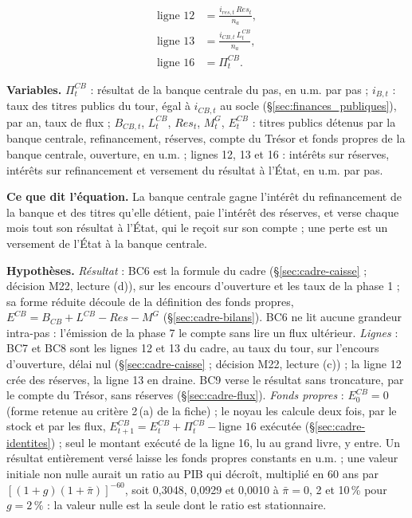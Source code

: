 \documentclass[11pt,a4paper]{article}
\newcommand{\variables}{\par\noindent\textbf{Variables.} }
\newcommand{\sens}{\par\noindent\textbf{Ce que dit l'équation.} }
\newcommand{\hyp}{\par\noindent\textbf{Hypothèses.} }
\begin{document}
\begin{proposee}
\begin{align}
\text{ligne 12} &= \frac{i_{\mathit{res},t}\,\mathit{Res}_t}{n_a} , \tag{BC7}\label{eq:banque_centrale-interets-reserves} \\
\text{ligne 13} &= \frac{i_{\mathit{CB},t}\,L^{\mathit{CB}}_t}{n_a} , \tag{BC8}\label{eq:banque_centrale-interets-refinancement} \\
\text{ligne 16} &= \Pi^{\mathit{CB}}_t . \tag{BC9}\label{eq:banque_centrale-versement-resultat}
\end{align}
\begin{lecture}
\variables $\Pi^{\mathit{CB}}_t$ : résultat de la banque centrale du pas, en u.m. par pas ; $i_{B,t}$ : taux des titres publics du tour, égal à $i_{\mathit{CB},t}$ au socle (\S\ref{sec:finances_publiques}), par an, taux de flux ; $B_{\mathit{CB},t}$, $L^{\mathit{CB}}_t$, $\mathit{Res}_t$, $M^G_t$, $E^{\mathit{CB}}_t$ : titres publics détenus par la banque centrale, refinancement, réserves, compte du Trésor et fonds propres de la banque centrale, ouverture, en u.m. ; lignes 12, 13 et 16 : intérêts sur réserves, intérêts sur refinancement et versement du résultat à l'État, en u.m. par pas.
\sens La banque centrale gagne l'intérêt du refinancement de la banque et des titres qu'elle détient, paie l'intérêt des réserves, et verse chaque mois tout son résultat à l'État, qui le reçoit sur son compte ; une perte est un versement de l'État à la banque centrale.
\hyp \emph{Résultat} : BC6 est la formule du cadre (\S\ref{sec:cadre-caisse} ; décision M22, lecture (d)), sur les encours d'ouverture et les taux de la phase 1 ; sa forme réduite découle de la définition des fonds propres, $E^{\mathit{CB}} = B_{\mathit{CB}} + L^{\mathit{CB}} - \mathit{Res} - M^G$ (\S\ref{sec:cadre-bilans}). BC6 ne lit aucune grandeur intra-pas : l'émission de la phase 7 le compte sans lire un flux ultérieur. \emph{Lignes} : BC7 et BC8 sont les lignes 12 et 13 du cadre, au taux du tour, sur l'encours d'ouverture, délai nul (\S\ref{sec:cadre-caisse} ; décision M22, lecture (c)) ; la ligne 12 crée des réserves, la ligne 13 en draine. BC9 verse le résultat sans troncature, par le compte du Trésor, sans réserves (\S\ref{sec:cadre-flux}). \emph{Fonds propres} : $E^{\mathit{CB}}_0 = 0$ (forme retenue au critère 2\,(a) de la fiche) ; le noyau les calcule deux fois, par le stock et par les flux, $E^{\mathit{CB}}_{t+1} = E^{\mathit{CB}}_t + \Pi^{\mathit{CB}}_t - \text{ligne 16 exécutée}$ (\S\ref{sec:cadre-identites}) ; seul le montant exécuté de la ligne 16, lu au grand livre, y entre. Un résultat entièrement versé laisse les fonds propres constants en u.m. ; une valeur initiale non nulle aurait un ratio au PIB qui décroît, multiplié en 60 ans par $[(1 + g)(1 + \bar\pi)]^{-60}$, soit 0,3048, 0,0929 et 0,0010 à $\bar\pi = 0$, 2 et 10\,\% pour $g = 2\,\%$ : la valeur nulle est la seule dont le ratio est stationnaire.

\end{lecture}
\end{proposee}
\end{document}
